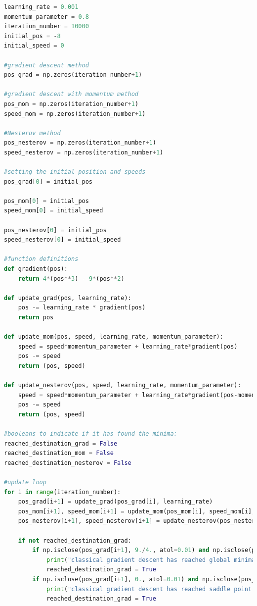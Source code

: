 \documentclass{article}
\begin{document}
\begin{lstlisting}[language = Python]
learning_rate = 0.001
momentum_parameter = 0.8
iteration_number = 10000
initial_pos = -8
initial_speed = 0

#gradient descent method
pos_grad = np.zeros(iteration_number+1)

#gradient descent with momentum method
pos_mom = np.zeros(iteration_number+1)
speed_mom = np.zeros(iteration_number+1)

#Nesterov method
pos_nesterov = np.zeros(iteration_number+1)
speed_nesterov = np.zeros(iteration_number+1)

#setting the initial position and speeds
pos_grad[0] = initial_pos

pos_mom[0] = initial_pos
speed_mom[0] = initial_speed

pos_nesterov[0] = initial_pos
speed_nesterov[0] = initial_speed

#function definitions
def gradient(pos):
    return 4*(pos**3) - 9*(pos**2)

def update_grad(pos, learning_rate):
    pos -= learning_rate * gradient(pos)
    return pos

def update_mom(pos, speed, learning_rate, momentum_parameter):
    speed = speed*momentum_parameter + learning_rate*gradient(pos)
    pos -= speed
    return (pos, speed)
    
def update_nesterov(pos, speed, learning_rate, momentum_parameter):
    speed = speed*momentum_parameter + learning_rate*gradient(pos-momentum_parameter*speed)
    pos -= speed
    return (pos, speed)

#booleans to indicate if it has found the minima:
reached_destination_grad = False
reached_destination_mom = False
reached_destination_nesterov = False

#update loop
for i in range(iteration_number):
    pos_grad[i+1] = update_grad(pos_grad[i], learning_rate)
    pos_mom[i+1], speed_mom[i+1] = update_mom(pos_mom[i], speed_mom[i], learning_rate, momentum_parameter)
    pos_nesterov[i+1], speed_nesterov[i+1] = update_nesterov(pos_nesterov[i], speed_nesterov[i], learning_rate, momentum_parameter)

    if not reached_destination_grad:
        if np.isclose(pos_grad[i+1], 9./4., atol=0.01) and np.isclose(pos_grad[i], 9./4., atol=0.01):
            print("classical gradient descent has reached global minima in ", i, "iterations")
            reached_destination_grad = True
        if np.isclose(pos_grad[i+1], 0., atol=0.01) and np.isclose(pos_grad[i], 0., atol=0.01):
            print("classical gradient descent has reached saddle point in ", i, "iterations")
            reached_destination_grad = True


\end{lstlisting}
\end{document}
